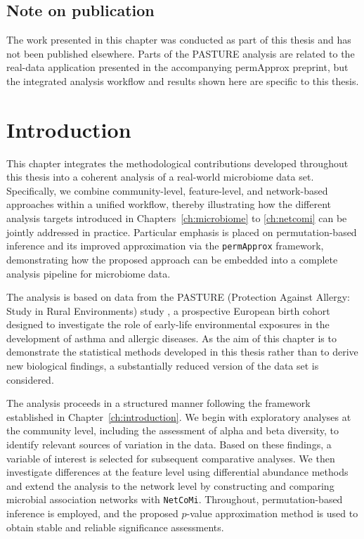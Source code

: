 \subsection*{Note on publication}

The work presented in this chapter was conducted as part of this thesis and has not been published elsewhere. Parts of the PASTURE analysis are related to the real-data application presented in the accompanying permApprox preprint, but the integrated analysis workflow and results shown here are specific to this thesis.

\newpage

\section{Introduction}
\label{sec:7app:intro}

This chapter integrates the methodological contributions developed throughout this thesis into a coherent analysis of a real-world microbiome data set. Specifically, we combine community-level, feature-level, and network-based approaches within a unified workflow, thereby illustrating how the different analysis targets introduced in Chapters~\ref{ch:microbiome} to \ref{ch:netcomi} can be jointly addressed in practice. Particular emphasis is placed on permutation-based inference and its improved approximation via the \texttt{permApprox} framework, demonstrating how the proposed approach can be embedded into a complete analysis pipeline for microbiome data.

The analysis is based on data from the PASTURE (Protection Against Allergy: Study in Rural Environments) study \citep{vonmutius2006pasture}, a prospective European birth cohort designed to investigate the role of early-life environmental exposures in the development of asthma and allergic diseases. As the aim of this chapter is to demonstrate the statistical methods developed in this thesis rather than to derive new biological findings, a substantially reduced version of the data set is considered.

The analysis proceeds in a structured manner following the framework established in Chapter~\ref{ch:introduction}. We begin with exploratory analyses at the community level, including the assessment of alpha and beta diversity, to identify relevant sources of variation in the data. Based on these findings, a variable of interest is selected for subsequent comparative analyses. We then investigate differences at the feature level using differential abundance methods and extend the analysis to the network level by constructing and comparing microbial association networks with \texttt{NetCoMi}. Throughout, permutation-based inference is employed, and the proposed $p$-value approximation method is used to obtain stable and reliable significance assessments.

